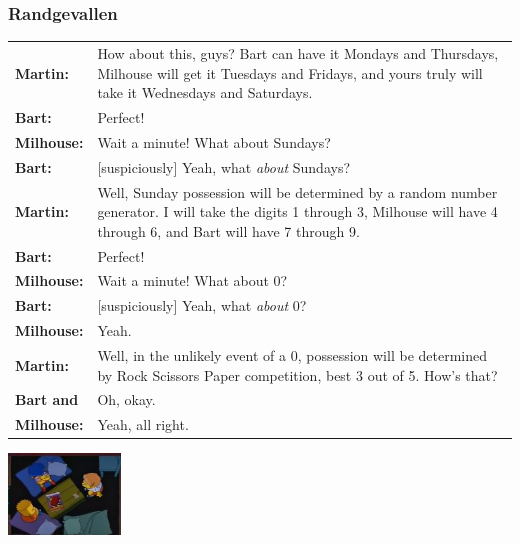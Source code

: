 \documentclass{../khlslides}
\begin{document}
\begin{frame}
  \frametitle{Randgevallen}
  \begin{center} \scriptsize
    \begin{tabular}{lp{8cm}}
      \bf Martin:   & How about this, guys?  Bart can have it Mondays and Thursdays, Milhouse will get it Tuesdays and Fridays, and yours truly will take it Wednesdays and Saturdays. \\
      \bf Bart:     & Perfect! \\
      \bf Milhouse: & Wait a minute!  What about Sundays? \\
      \bf Bart:     & [suspiciously] Yeah, what \emph{about} Sundays? \\
      \bf Martin:   & Well, Sunday possession will be determined by a random number
                generator.  I will take the digits 1 through 3, Milhouse will
                have 4 through 6, and Bart will have 7 through 9. \\
      \bf Bart:     & Perfect! \\
      \bf Milhouse: & Wait a minute!  What about 0? \\
      \bf Bart:     & [suspiciously] Yeah, what \emph{about} 0? \\
      \bf Milhouse: & Yeah. \\
      \bf Martin:   & Well, in the unlikely event of a 0, possession will be determined
                  by Rock Scissors Paper competition, best 3 out of 5.  How's that? \\
      \bf Bart and & Oh, okay. \\
      \bf Milhouse: & Yeah, all right.
    \end{tabular}
  \end{center}
  \begin{center}
    \includegraphics[width=3cm]{simpsons.png}
  \end{center}
\end{frame}
\end{document}
